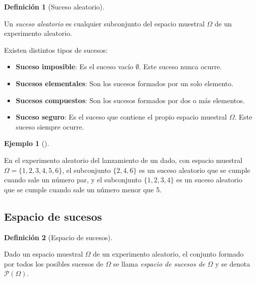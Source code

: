 \documentclass[
  a4paper,
]{scrreport}
\providecommand{\tightlist}{%
  \setlength{\itemsep}{0pt}\setlength{\parskip}{0pt}}\usepackage{longtable,booktabs,array}
\theoremstyle{plain}
\theoremstyle{definition}
\newtheorem{example}{Ejemplo}[chapter]
\theoremstyle{definition}
\newtheorem{definition}{Definición}[chapter]
\theoremstyle{remark}
\begin{document}
\begin{definition}[Suceso
aleatorio]\protect\hypertarget{def-suceso-aleatorio}{}\label{def-suceso-aleatorio}

Un \emph{suceso aleatorio} es cualquier subconjunto del espacio muestral
\(\Omega\) de un experimento aleatorio.

\end{definition}

Existen distintos tipos de sucesos:

\begin{itemize}
\tightlist
\item
  \textbf{Suceso imposible}: Es el suceso vacío \(\emptyset\). Este
  suceso nunca ocurre.
\item
  \textbf{Sucesos elementales}: Son los sucesos formados por un solo
  elemento.
\item
  \textbf{Sucesos compuestos}: Son los sucesos formados por dos o más
  elementos.
\item
  \textbf{Suceso seguro}: Es el suceso que contiene el propio espacio
  muestral \(\Omega\). Este suceso siempre ocurre.
\end{itemize}

\begin{example}[]\protect\hypertarget{exm-sucesos-aleatorios}{}\label{exm-sucesos-aleatorios}

En el experimento aleatorio del lanzamiento de un dado, con espacio
muestral \(\Omega=\{1, 2, 3, 4, 5, 6\}\), el subconjunto \(\{2, 4, 6\}\)
es un suceso aleatorio que se cumple cuando sale un número par, y el
subconjunto \(\{1, 2, 3, 4\}\) es un suceso aleatorio que se cumple
cuando sale un número menor que 5.

\end{example}

\subsection{Espacio de sucesos}\label{espacio-de-sucesos}

\begin{definition}[Espacio de
sucesos]\protect\hypertarget{def-espacio-sucesos}{}\label{def-espacio-sucesos}

Dado un espacio muestral \(\Omega\) de un experimento aleatorio, el
conjunto formado por todos los posibles sucesos de \(\Omega\) se llama
\emph{espacio de sucesos de \(\Omega\)} y se denota
\(\mathcal{P}(\Omega)\).

\end{definition}
\end{document}

